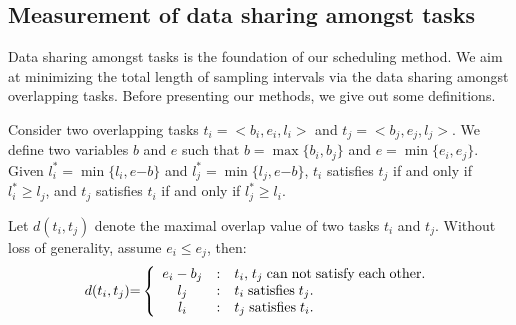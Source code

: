 \documentclass[prodmode,acmtosn]{acmsmall}
\begin{document}
\subsection{Measurement of data sharing amongst tasks}
Data sharing amongst tasks is the foundation of our scheduling method. We aim at minimizing the total length of sampling intervals via the data sharing amongst overlapping tasks. Before presenting our methods, we give out some definitions.

\begin{definition}[Satisfy]
Consider two overlapping tasks $t_i\mathrm{=<}b_i,e_i,l_i\mathrm{>}$ and $t_j\mathrm{=<}b_j,e_j,l_j\mathrm{>}$. We define two variables $b$ and $e$ such that $b\mathrm{=}\max\{b_i,b_j\}$ and $e\mathrm{=}\min\{e_i,e_j\}$. Given $l_i^\ast\mathrm{=}\min\{l_i,e\mathrm{-}b\}$ and $l_j^\ast\mathrm{=}\min\{l_j,e\mathrm{-}b\}$, $t_i$ satisfies $t_j$ if and only if $l_i^\ast\mathrm{\ge} l_j$, and $t_j$ satisfies $t_i$ if and only if $l_j^\ast\mathrm{\ge} l_i$.
\label{definition_satisfy}
\end{definition}

\begin{definition}[Overlap]
Let $d(t_i,t_j)$ denote the maximal overlap value of two tasks $t_i$ and $t_j$. Without loss of generality, assume $e_i\mathrm{\le} e_j$, then:
\begin{equation}
d(t_i,t_j) \mathrm{=} \left \{ \begin{array}
{c@{\quad:\quad}l}
e_i-b_j & t_i\mathrm{,}\; t_j \; \mathrm{can}\; \mathrm{not}\; \mathrm{satisfy}\; \mathrm{each}\; \mathrm{other}.\\
l_j & t_i\; \mathrm{satisfies}\; t_j.\\
l_i & t_j\; \mathrm{satisfies}\; t_i.
\end{array} \right.
\end{equation}
\label{definition_maximal_overlap}
\end{definition}
\end{document}
